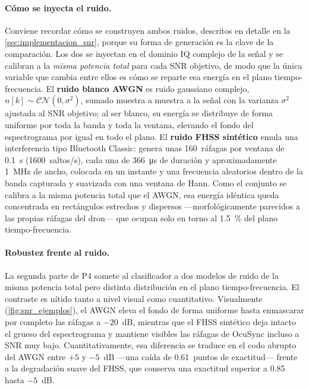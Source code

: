 \paragraph{Cómo se inyecta el ruido.}
Conviene recordar cómo se construyen ambos ruidos, descritos en detalle en la \cref{sec:implementacion_snr}, porque su forma de generación es la clave de la comparación. Los dos se inyectan en el dominio IQ complejo de la señal y se calibran a la \emph{misma potencia total} para cada SNR objetivo, de modo que la única variable que cambia entre ellos es cómo se reparte esa energía en el plano tiempo-frecuencia. El \textbf{ruido blanco AWGN} es ruido gaussiano complejo, $n[k]\sim\mathcal{CN}(0,\sigma^2)$, sumado muestra a muestra a la señal con la varianza $\sigma^2$ ajustada al SNR objetivo; al ser blanco, su energía se distribuye de forma uniforme por toda la banda y toda la ventana, elevando el fondo del espectrograma por igual en todo el plano. El \textbf{ruido FHSS sintético} emula una interferencia tipo Bluetooth Classic: genera unas \num{160}~ráfagas por ventana de \SI{0.1}{\second} (\num{1600}~saltos/s), cada una de \SI{366}{\micro\second} de duración y aproximadamente \SI{1}{\mega\hertz} de ancho, colocada en un instante y una frecuencia aleatorios dentro de la banda capturada y suavizada con una ventana de Hann. Como el conjunto se calibra a la misma potencia total que el AWGN, esa energía idéntica queda concentrada en rectángulos estrechos y dispersos ---morfológicamente parecidos a las propias ráfagas del dron--- que ocupan solo en torno al \SI{1,5}{\percent} del plano tiempo-frecuencia.

\paragraph{Robustez frente al ruido.}
La segunda parte de P4 somete al clasificador a dos modelos de ruido de la misma potencia total pero distinta distribución en el plano tiempo-frecuencia. El contraste es nítido tanto a nivel visual como cuantitativo. Visualmente (\cref{fig:snr_ejemplos}), el AWGN eleva el fondo de forma uniforme hasta enmascarar por completo las ráfagas a $-20$~dB, mientras que el FHSS sintético deja intacto el grueso del espectrograma y mantiene visibles las ráfagas de OcuSync incluso a SNR muy bajo. Cuantitativamente, esa diferencia se traduce en el codo abrupto del AWGN entre $+5$ y $-5$~dB ---una caída de \num{0,61}~puntos de exactitud--- frente a la degradación suave del FHSS, que conserva una exactitud superior a \num{0,85} hasta $-5$~dB.

